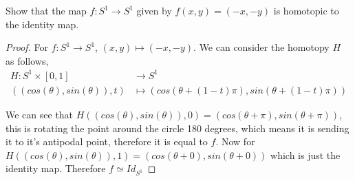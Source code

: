 \documentclass[12pt]{article}
\begin{document}
Show that the map $f:S^1\rightarrow S^1$ given by $f(x,y)=(-x,-y)$ is homotopic to the identity map.
\begin{proof}
    For $f: S^1 \to S^1$, $(x,y)\mapsto (-x,-y)$. We can consider the homotopy $H$ as follows,
    \begin{align*}
        H: S^1\times[0,1] &\to S^1 \\
        ((cos(\theta),sin(\theta)),t) &\mapsto (cos(\theta + (1-t)\pi), sin(\theta+(1-t)\pi))
    \end{align*}

    We can see that $H((cos(\theta),sin(\theta)),0) = (cos(\theta + \pi),sin(\theta + \pi))$, this is rotating the point around the circle 180 degrees, which means it is sending it to it's antipodal point, therefore it is equal to $f$. Now for $H((cos(\theta), sin(\theta)),1) = (cos(\theta + 0), sin(\theta + 0))$ which is just the identity map. Therefore $f\simeq Id_{S^1}$
\end{proof}
\end{document}
